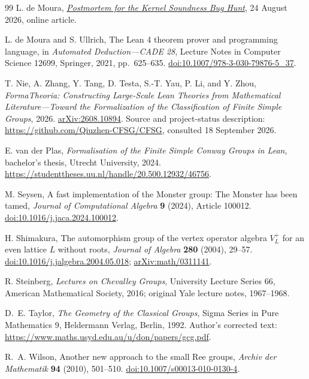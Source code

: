 \documentclass[11pt]{article}
\numberwithin{equation}{section}
\theoremstyle{definition}
\begin{document}
\begin{thebibliography}{99}
L. de Moura,
\href{https://leodemoura.github.io/blog/2026-8-24-postmortem-for-the-kernel-soundness-bug-hunt/}{\emph{Postmortem for the Kernel Soundness Bug Hunt}},
24 August 2026, online article.

L. de Moura and S. Ullrich,
The Lean 4 theorem prover and programming language,
in \emph{Automated Deduction---CADE 28}, Lecture Notes in Computer
Science 12699, Springer, 2021, pp.~625--635.
\href{https://doi.org/10.1007/978-3-030-79876-5_37}{doi:10.1007/978-3-030-79876-5\_37}.

T. Nie, A. Zhang, Y. Tang, D. Testa, S.-T. Yau, P. Li, and Y. Zhou,
\emph{FormaTheoria: Constructing Large-Scale Lean Theories from
Mathematical Literature---Toward the Formalization of the Classification
of Finite Simple Groups}, 2026.
\href{https://arxiv.org/abs/2608.10894}{arXiv:2608.10894}.
Source and project-status description:
\url{https://github.com/Qiuzhen-CFSG/CFSG}, consulted 18 September 2026.

E. van der Plas, \emph{Formalisation of the Finite Simple Conway Groups
in Lean}, bachelor's thesis, Utrecht University, 2024.
\url{https://studenttheses.uu.nl/handle/20.500.12932/46756}.

M. Seysen,
A fast implementation of the Monster group: The Monster has been tamed,
\emph{Journal of Computational Algebra} \textbf{9} (2024), Article 100012.
\href{https://doi.org/10.1016/j.jaca.2024.100012}{doi:10.1016/j.jaca.2024.100012}.

H. Shimakura,
The automorphism group of the vertex operator algebra $V_L^+$ for an
even lattice $L$ without roots,
\emph{Journal of Algebra} \textbf{280} (2004), 29--57.
\href{https://doi.org/10.1016/j.jalgebra.2004.05.018}{doi:10.1016/j.jalgebra.2004.05.018};
\href{https://arxiv.org/abs/math/0311141}{arXiv:math/0311141}.

R. Steinberg, \emph{Lectures on Chevalley Groups},
University Lecture Series 66, American Mathematical Society, 2016;
original Yale lecture notes, 1967--1968.

D.~E. Taylor, \emph{The Geometry of the Classical Groups},
Sigma Series in Pure Mathematics 9, Heldermann Verlag, Berlin, 1992.
Author's corrected text:
\url{https://www.maths.usyd.edu.au/u/don/papers/gcg.pdf}.

R.~A. Wilson, Another new approach to the small Ree groups,
\emph{Archiv der Mathematik} \textbf{94} (2010), 501--510.
\href{https://doi.org/10.1007/s00013-010-0130-4}{doi:10.1007/s00013-010-0130-4}.


\end{thebibliography}
\end{document}
